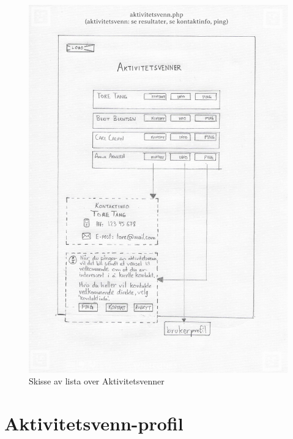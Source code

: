 \begin{figure}[H]
\centering
\includegraphics[width=.9\textwidth]{Illustrasjoner/Skisser-pdf/1.0/1-19-aktivitetsvenner.pdf}
\caption{Skisse av lista over Aktivitetsvenner}
\label{vedlegg:1-19-aktivitetsvenner}
\end{figure}

\section{Aktivitetsvenn-profil}

